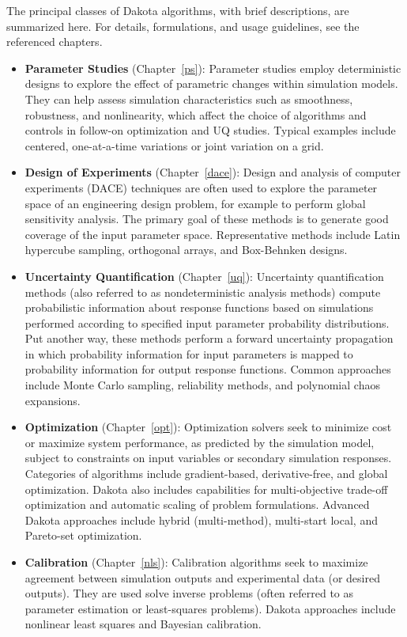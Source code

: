 The principal classes of Dakota algorithms, with brief descriptions,
are summarized here.  For details, formulations, and usage guidelines,
see the referenced chapters.
\begin{itemize}
\item {\bf Parameter Studies} (Chapter~\ref{ps}): Parameter studies
  employ deterministic designs to explore the effect of parametric
  changes within simulation models.  They can help assess simulation
  characteristics such as smoothness, robustness, and nonlinearity,
  which affect the choice of algorithms and controls in follow-on
  optimization and UQ studies.  Typical examples include centered,
  one-at-a-time variations or joint variation on a grid.

\item {\bf Design of Experiments} (Chapter~\ref{dace}): Design and
  analysis of computer experiments (DACE) techniques are often used to
  explore the parameter space of an engineering design problem, for
  example to perform global sensitivity analysis.  The primary goal of
  these methods is to generate good coverage of the input parameter
  space.  Representative methods include Latin hypercube sampling,
  orthogonal arrays, and Box-Behnken designs.

\item {\bf Uncertainty Quantification} (Chapter~\ref{uq}): Uncertainty
  quantification methods (also referred to as nondeterministic
  analysis methods) compute probabilistic information about response
  functions based on simulations performed according to specified
  input parameter probability distributions.  Put another way, these
  methods perform a forward uncertainty propagation in which
  probability information for input parameters is mapped to
  probability information for output response functions.  Common
  approaches include Monte Carlo sampling, reliability methods, and
  polynomial chaos expansions.

\item {\bf Optimization} (Chapter~\ref{opt}): Optimization solvers
  seek to minimize cost or maximize system performance, as predicted
  by the simulation model, subject to constraints on input variables
  or secondary simulation responses.  Categories of algorithms
  include gradient-based, derivative-free, and global optimization.
  Dakota also includes capabilities for multi-objective trade-off
  optimization and automatic scaling of problem formulations.  Advanced
  Dakota approaches include hybrid (multi-method), multi-start local,
  and Pareto-set optimization.

\item {\bf Calibration} (Chapter~\ref{nls}): Calibration algorithms
  seek to maximize agreement between simulation outputs and
  experimental data (or desired outputs).  They are used solve inverse
  problems (often referred to as parameter estimation or least-squares
  problems).  Dakota approaches include nonlinear least squares and
  Bayesian calibration.

\end{itemize}

